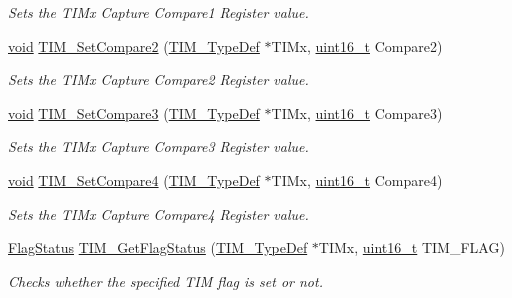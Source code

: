 \begin{DoxyCompactItemize}
\begin{DoxyCompactList}\small\item\em Sets the T\-I\-Mx Capture Compare1 Register value. \end{DoxyCompactList}\item 
\hyperlink{group___n_a_m_e_ga18028b8badbf1ea7e704ccac3c488e82}{void} \hyperlink{group___t_i_m___exported___functions_ga0175ef4fabade443909002a63d4e9758}{T\-I\-M\-\_\-\-Set\-Compare2} (\hyperlink{struct_t_i_m___type_def}{T\-I\-M\-\_\-\-Type\-Def} $\ast$T\-I\-Mx, \hyperlink{stdint_8h_a273cf69d639a59973b6019625df33e30}{uint16\-\_\-t} Compare2)
\begin{DoxyCompactList}\small\item\em Sets the T\-I\-Mx Capture Compare2 Register value. \end{DoxyCompactList}\item 
\hyperlink{group___n_a_m_e_ga18028b8badbf1ea7e704ccac3c488e82}{void} \hyperlink{group___t_i_m___exported___functions_ga416df50f4223351e366ae40a4ec163ae}{T\-I\-M\-\_\-\-Set\-Compare3} (\hyperlink{struct_t_i_m___type_def}{T\-I\-M\-\_\-\-Type\-Def} $\ast$T\-I\-Mx, \hyperlink{stdint_8h_a273cf69d639a59973b6019625df33e30}{uint16\-\_\-t} Compare3)
\begin{DoxyCompactList}\small\item\em Sets the T\-I\-Mx Capture Compare3 Register value. \end{DoxyCompactList}\item 
\hyperlink{group___n_a_m_e_ga18028b8badbf1ea7e704ccac3c488e82}{void} \hyperlink{group___t_i_m___exported___functions_gaf428edf474804691d6f587e78c97a082}{T\-I\-M\-\_\-\-Set\-Compare4} (\hyperlink{struct_t_i_m___type_def}{T\-I\-M\-\_\-\-Type\-Def} $\ast$T\-I\-Mx, \hyperlink{stdint_8h_a273cf69d639a59973b6019625df33e30}{uint16\-\_\-t} Compare4)
\begin{DoxyCompactList}\small\item\em Sets the T\-I\-Mx Capture Compare4 Register value. \end{DoxyCompactList}\item 
\hyperlink{group___exported__types_ga89136caac2e14c55151f527ac02daaff}{Flag\-Status} \hyperlink{group___t_i_m___exported___functions_ga0adcbbd5e838ec8642e7a9b80075f41f}{T\-I\-M\-\_\-\-Get\-Flag\-Status} (\hyperlink{struct_t_i_m___type_def}{T\-I\-M\-\_\-\-Type\-Def} $\ast$T\-I\-Mx, \hyperlink{stdint_8h_a273cf69d639a59973b6019625df33e30}{uint16\-\_\-t} T\-I\-M\-\_\-\-F\-L\-A\-G)
\begin{DoxyCompactList}\small\item\em Checks whether the specified T\-I\-M flag is set or not. \end{DoxyCompactList}\end{DoxyCompactItemize}


